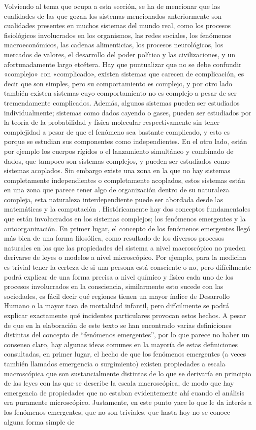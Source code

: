 Volviendo al tema que ocupa a esta sección, se ha de mencionar que las cualidades de las que gozan los sistemas mencionados anteriormente son cualidades presentes en muchos sistemas del mundo real, como los procesos fisiológicos involucrados en los organismos, las redes sociales, los fenómenos macroeconómicos, las cadenas alimenticias, los procesos neurológicos, los mercados de valores, el desarrollo del poder político y las civilizaciones, y un afortunadamente largo etcétera. Hay que puntualizar que no se debe confundir «complejo» con «complicado», existen sistemas que carecen de complicación, es decir que son simples, pero su comportamiento es complejo, y por otro lado también existen sistemas cuyo comportamiento no es complejo a pesar de ser tremendamente complicados. Además, algunos sistemas pueden ser estudiados individualmente; sistemas como dados cayendo o gases, pueden ser estudiados por la teoría de la probabilidad y física molecular respectivamente sin tener complejidad a pesar de que el fenómeno sea bastante complicado, y esto es porque se estudian sus componentes como independientes. En el otro lado, están por ejemplo los cuerpos rígidos o el lanzamiento simultáneo y combinado de dados, que tampoco son sistemas complejos, y pueden ser estudiados como sistemas acoplados. Sin embargo existe una zona en la que no hay sistemas completamente independientes o completamente acoplados, estos sistemas están en una zona que parece tener algo de organización dentro de su naturaleza compleja, esta naturaleza interdependiente puede ser abordada desde las matemáticas y la computación . Históricamente hay dos conceptos fundamentales que están involucrados en los sistemas complejos; los fenómenos emergentes y la autoorganización. En primer lugar, el concepto de los fenómenos emergentes llegó más bien de una forma filosófica, como resultado de los diversos procesos naturales en los que las propiedades del sistema a nivel macroscópico no pueden derivarse de leyes o modelos a nivel microscópico. Por ejemplo, para la medicina es trivial tener la certeza de si una persona está consciente o no, pero difícilmente podrá explicar de una forma precisa a nivel químico y físico cada uno de los procesos involucrados en la consciencia, similarmente esto sucede con las sociedades, es fácil decir qué regiones tienen un mayor índice de Desarrollo Humano o la mayor tasa de mortalidad infantil, pero difícilmente se podrá explicar exactamente qué incidentes particulares provocan estos hechos. A pesar de que en la elaboración de este texto se han encontrado varias definiciones distintas del concepto de “fenómenos emergentes”, por lo que parece no haber un consenso claro, hay algunas ideas comunes en la mayoría de estas definiciones consultadas, en primer lugar, el hecho de que los fenómenos emergentes (a veces también llamados emergencia o surgimiento) existen propiedades a escala macroscópica que son sustancialmente distintas de lo que se derivaría en principio de las leyes con las que se describe la escala macroscópica, de modo que hay emergencia de propiedades que no estaban evidentemente ahí cuando el análisis era puramente microscópico. Justamente, en este punto yace lo que le da interés a los fenómenos emergentes, que no son triviales, que hasta hoy no se conoce alguna forma simple de 